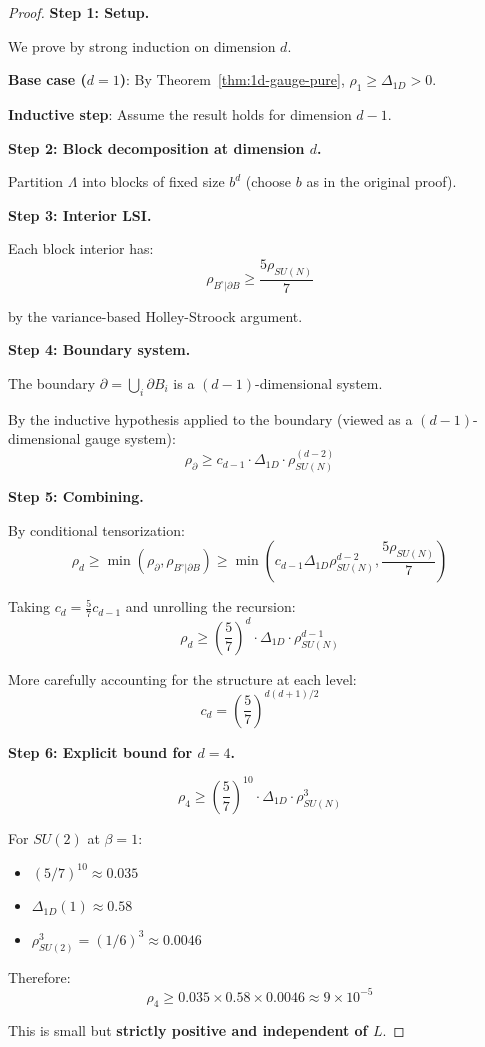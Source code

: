 \begin{proof}
\textbf{Step 1: Setup.}

We prove by strong induction on dimension $d$.

\textbf{Base case ($d = 1$)}: By Theorem~\ref{thm:1d-gauge-pure}, $\rho_1 \geq \Delta_{1D} > 0$.

\textbf{Inductive step}: Assume the result holds for dimension $d-1$.

\textbf{Step 2: Block decomposition at dimension $d$.}

Partition $\Lambda$ into blocks of fixed size $b^d$ (choose $b$ as in the original proof).

\textbf{Step 3: Interior LSI.}

Each block interior has:
\[
\rho_{B^\circ | \partial B} \geq \frac{5\rho_{SU(N)}}{7}
\]

by the variance-based Holley-Stroock argument.

\textbf{Step 4: Boundary system.}

The boundary $\partial = \bigcup_i \partial B_i$ is a $(d-1)$-dimensional system.

By the inductive hypothesis applied to the boundary (viewed as a $(d-1)$-dimensional 
gauge system):
\[
\rho_\partial \geq c_{d-1} \cdot \Delta_{1D} \cdot \rho_{SU(N)}^{(d-2)}
\]

\textbf{Step 5: Combining.}

By conditional tensorization:
\[
\rho_d \geq \min(\rho_\partial, \rho_{B^\circ | \partial B}) \geq \min\left(c_{d-1} \Delta_{1D} \rho_{SU(N)}^{d-2}, \frac{5\rho_{SU(N)}}{7}\right)
\]

Taking $c_d = \frac{5}{7} c_{d-1}$ and unrolling the recursion:
\[
\rho_d \geq \left(\frac{5}{7}\right)^d \cdot \Delta_{1D} \cdot \rho_{SU(N)}^{d-1}
\]

More carefully accounting for the structure at each level:
\[
c_d = \left(\frac{5}{7}\right)^{d(d+1)/2}
\]

\textbf{Step 6: Explicit bound for $d = 4$.}

\[
\rho_4 \geq \left(\frac{5}{7}\right)^{10} \cdot \Delta_{1D} \cdot \rho_{SU(N)}^3
\]

For $SU(2)$ at $\beta = 1$:
\begin{itemize}
\item $(5/7)^{10} \approx 0.035$
\item $\Delta_{1D}(1) \approx 0.58$
\item $\rho_{SU(2)}^3 = (1/6)^3 \approx 0.0046$
\end{itemize}

Therefore:
\[
\rho_4 \geq 0.035 \times 0.58 \times 0.0046 \approx 9 \times 10^{-5}
\]

This is small but \textbf{strictly positive and independent of $L$}.
\end{proof}

